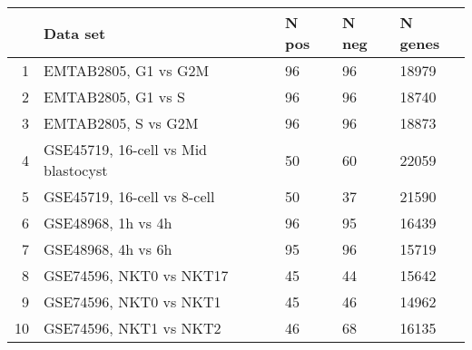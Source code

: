\begin{table}[ht]
\centering
\begin{tabular}{rllll}
  \hline
 & Data set & N pos & N neg & N genes \\ 
  \hline
1 & EMTAB2805, G1 vs G2M & 96 & 96 & 18979 \\ 
  2 & EMTAB2805, G1 vs S & 96 & 96 & 18740 \\ 
  3 & EMTAB2805, S vs G2M & 96 & 96 & 18873 \\ 
  4 & GSE45719, 16-cell vs Mid blastocyst & 50 & 60 & 22059 \\ 
  5 & GSE45719, 16-cell vs 8-cell & 50 & 37 & 21590 \\ 
  6 & GSE48968, 1h vs 4h & 96 & 95 & 16439 \\ 
  7 & GSE48968, 4h vs 6h & 95 & 96 & 15719 \\ 
  8 & GSE74596, NKT0 vs NKT17 & 45 & 44 & 15642 \\ 
  9 & GSE74596, NKT0 vs NKT1 & 45 & 46 & 14962 \\ 
  10 & GSE74596, NKT1 vs NKT2 & 46 & 68 & 16135 \\ 
   \hline
\end{tabular}
\end{table}
